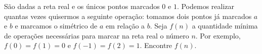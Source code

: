 São dadas a reta real e os únicos pontos marcados $0$ e $1$. Podemos realizar quantas vezes quisermos a seguinte operação: tomamos dois pontos já marcados $a$ e $b$ e marcamos o simétrico de $a$ em relação a $b$. Seja $f(n)$ a quantidade mínima de operações necessárias para marcar na reta real o número $n$. Por exemplo, $f(0) = f(1) = 0$ e $f(-1) = f(2) = 1$. Encontre $f(n)$.
